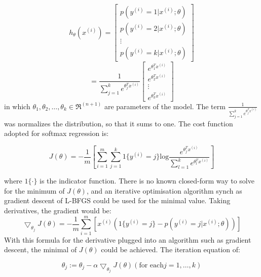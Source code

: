 \documentclass[journal]{IEEEtran}
\begin{document}
\begin{equation}
h_{\theta}(x^{(i)}) = 
\left[
      \begin{array}{cccccc}
        p(y^{(i)}=1|x^{(i)};\theta) \\
        p(y^{(i)}=2|x^{(i)};\theta) \\
        \vdots \\
        p(y^{(i)}=k|x^{(i)};\theta)
      \end{array}
    \right]
\end{equation}
\begin{equation}
= \frac{1}{\sum_{j=1}^ke^{\theta_j^Tx^{(i)}}}
\left[
      \begin{array}{cccccc}
        e^{\theta_1^Tx^{(i)}}\\
        e^{\theta_2^Tx^{(i)}}\\
        \vdots \\
        e^{\theta_k^Tx^{(i)}}
      \end{array}
    \right]
\end{equation}
\noindent in which $\theta_1,\theta_2,\ldots,\theta_k \in \Re^{(n+1)}$ are parameters of the model. The term $\frac{1}{\sum_{j=1}^ke^{\theta_j^Tx^{(i)}}}$ was normalizes the distribution, so that it sums to one.
The cost function adopted for softmax regression is:

\begin{equation}
J(\theta) = -\frac{1}{m}[\sum_{i=1}^m\sum_{j=1}^k1\{y^{(i)}=j\}\text{log}{\frac{e^{\theta_j^Tx^{(i)}}}{\sum_{l=1}^ke^{\theta_l^Tx^{(i)}}}}]
\end{equation}

where $1\{\cdot\}$ is the indicator function. There is no known closed-form way to solve for the minimum of $J(\theta)$, and an iterative optimisation algorithm synch as gradient descent of L-BFGS could be used for the minimal value.
Taking derivatives, the gradient would be:
\begin{equation}
\bigtriangledown_{\theta_j}J(\theta) = -\frac{1}{m}\sum_{i=1}^m[x^{(i)}(1\{y^{(i)}=j\}-p(y^{(i)}=j|x^{(i)};\theta))]
\end{equation}
With this formula for the derivative plugged into an algorithm such as gradient descent, the minimal of $J(\theta)$ could be achieved. The iteration equation of:

\begin{equation}
\theta_j :=\theta_j - \alpha{\bigtriangledown_{\theta_j}J(\theta)}   (\text{for each} j = 1,\ldots,k)
\end{equation}
\end{document}
